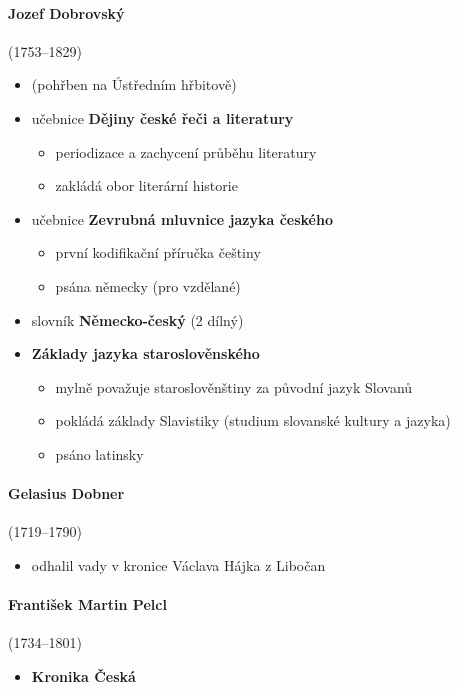 \paragraph{Jozef Dobrovský}(1753--1829)
\begin{itemize}
\item (pohřben na Ústředním hřbitově)
\item učebnice \textbf{Dějiny české řeči a literatury}
	\begin{itemize}
	\item periodizace a zachycení průběhu literatury
	\item zakládá obor literární historie
	\end{itemize}
\item učebnice \textbf{Zevrubná mluvnice jazyka českého}
	\begin{itemize}
	\item první kodifikační příručka češtiny
	\item psána německy (pro vzdělané)
	\end{itemize}
\item slovník \textbf{Německo-český} (2 dílný)
\item \textbf{Základy jazyka staroslověnského}
	\begin{itemize}
	\item mylně považuje staroslověnštiny za původní jazyk Slovanů
	\item pokládá základy Slavistiky (studium slovanské kultury a jazyka)
	\item psáno latinsky
	\end{itemize}
\end{itemize}

\paragraph{Gelasius Dobner}(1719--1790)
	\begin{itemize}
	\item odhalil vady v kronice Václava Hájka z Libočan
	\end{itemize}
	
\paragraph{František Martin Pelcl} (1734--1801)
	\begin{itemize}
	\item \textbf{Kronika Česká}
	\end{itemize}
	
